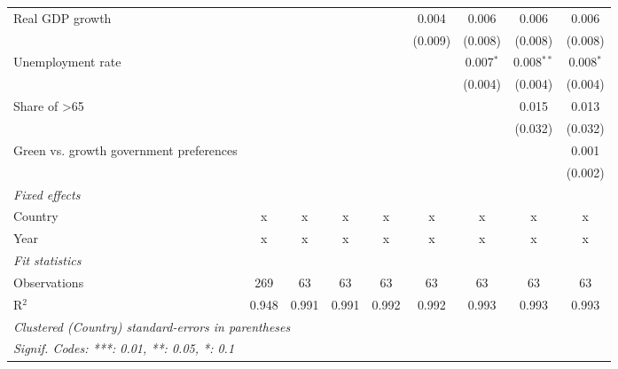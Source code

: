 \begin{table}[htbp]
\begin{tabular}{lcccccccc}
      Real GDP growth                                                    &              &               &         &             & 0.004       & 0.006       & 0.006        & 0.006\\   
                                                                         &              &               &         &             & (0.009)     & (0.008)     & (0.008)      & (0.008)\\   
      Unemployment rate                                                  &              &               &         &             &             & 0.007$^{*}$ & 0.008$^{**}$ & 0.008$^{*}$\\   
                                                                         &              &               &         &             &             & (0.004)     & (0.004)      & (0.004)\\   
      Share of >65                                                       &              &               &         &             &             &             & 0.015        & 0.013\\   
                                                                         &              &               &         &             &             &             & (0.032)      & (0.032)\\   
      Green vs. growth government preferences                            &              &               &         &             &             &             &              & 0.001\\   
                                                                         &              &               &         &             &             &             &              & (0.002)\\   
      \emph{Fixed effects}\\
      Country                                                            & x            & x             & x       & x           & x           & x           & x            & x\\  
      Year                                                               & x            & x             & x       & x           & x           & x           & x            & x\\  
      \midrule \emph{Fit statistics}\\
      Observations                                                       & 269          & 63            & 63      & 63          & 63          & 63          & 63           & 63\\  
      R$^2$                                                              & 0.948        & 0.991         & 0.991   & 0.992       & 0.992       & 0.993       & 0.993        & 0.993\\  
      \midrule
      \multicolumn{9}{l}{\emph{Clustered (Country) standard-errors in parentheses}}\\
      \multicolumn{9}{l}{\emph{Signif. Codes: ***: 0.01, **: 0.05, *: 0.1}}\\
   \end{tabular}
\end{table}


